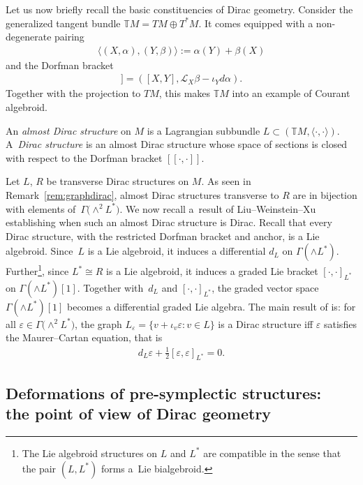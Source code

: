 \documentclass[pdftex]{sigma}
\numberwithin{equation}{section}
\newcommand{\Lie}{\mathcal{L}}
\newcommand{\T}{\mathbb{T}}
\newcommand{\oo}{[\![}
\newcommand{\cc}{]\!]}
\begin{document}
Let us now briefly recall the basic constituencies of Dirac geometry.
Consider the generalized tangent bundle $\T M=TM \oplus T^*M$. It comes equipped with a non-degenerate pairing
\begin{gather*}\langle(X,\alpha),(Y,\beta)\rangle := \alpha(Y) + \beta(X)\end{gather*}
and the Dorfman bracket
\begin{gather*}\oo(X,\alpha),(Y,\beta)\cc=([X,Y],\Lie_X\beta - \iota_Yd\alpha).\end{gather*}
Together with the projection to $TM$, this makes $\T M$ into an example of Courant algebroid.

\begin{Definition} An \emph{almost Dirac structure} on $M$ is a Lagrangian subbundle $L \subset (\T M,\langle\cdot,\cdot\rangle)$. A~\emph{Dirac structure} is an almost Dirac structure whose space of sections is closed
with respect to the Dorfman bracket $\oo\cdot,\cdot\cc$.
 \end{Definition}

\begin{Remark}\label{rem:LWXapp} Let $L$, $R$ be transverse Dirac structures on $M$. As seen in Remark~\ref{rem:graphdirac}, almost Dirac structures transverse to $R$ are in bijection with elements of~$\Gamma\big({\wedge}^2L^*\big)$. We now recall a~result of Liu--Weinstein--Xu \cite{LWX} establishing when such an almost Dirac structure is Dirac. Recall that every Dirac structure, with the restricted Dorfman bracket and anchor, is a Lie algebroid. Since~$L$ is a Lie algebroid, it induces a differential $d_L$ on $\Gamma(\wedge L^*)$. Further\footnote{The Lie algebroid structures on $L$ and $L^*$ are compatible in the sense that the pair $(L,L^*)$ forms a~Lie bialgebroid.}, since $L^*\cong R$ is a Lie algebroid, it induces a graded Lie bracket $[\cdot,\cdot]_{L^*}$ on $\Gamma(\wedge L^*)[1]$. Together with~$d_L$ and $[\cdot,\cdot]_{L^*}$, the graded vector space $\Gamma(\wedge L^*)[1]$ becomes a differential graded Lie algebra. The main result of \cite{LWX} is: for all $\varepsilon\in \Gamma\big({\wedge}^2L^*\big)$, the graph $L_{\varepsilon}=\{v+\iota_v\varepsilon\colon v\in L\}$ is a Dirac structure iff $\varepsilon$ satisfies the Maurer--Cartan equation, that is
\begin{gather*} d_L\varepsilon + \tfrac{1}{2}[\varepsilon,\varepsilon]_{L^*} =0.\end{gather*}
\end{Remark}

\subsection[Deformations of pre-symplectic structures: the point of view of Dirac geometry]{Deformations of pre-symplectic structures:\\ the point of view of Dirac geometry} \label{subsection:Diracview}
\end{document}
